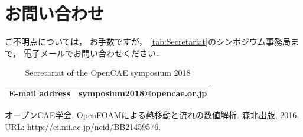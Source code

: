 \documentclass{ltjoc}
\begin{document}
\section{お問い合わせ}
ご不明点については，
お手数ですが，
\autoref{tab:Secretariat}のシンポジウム事務局まで，
電子メールでお問い合わせください．
\begin{table}[htbp]
  \centering
  \begin{tabular}{l|l}
    \hline
    E-mail address & symposium2018@opencae.or.jp\\
    \hline
    \end{tabular}
  \caption{Secretariat of the OpenCAE symposium 2018}
  \label{tab:Secretariat}
\end{table}
\begin{thebibliography}{1}
オープンCAE学会.
OpenFOAMによる熱移動と流れの数値解析.
森北出版, 2016.
URL: \href{http://ci.nii.ac.jp/ncid/BB21459576}{http://ci.nii.ac.jp/ncid/BB21459576}.
\end{thebibliography}
%
%
%
\end{document}
